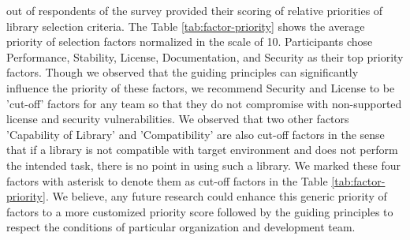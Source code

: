  out of  respondents of the survey provided their scoring of relative priorities of library selection criteria. The Table \ref{tab:factor-priority} shows the average priority of selection factors normalized in the scale of 10. Participants chose Performance, Stability, License, Documentation, and Security as their top priority factors. Though we observed that the guiding principles can significantly influence the priority of these factors, we recommend Security and License to be 'cut-off' factors for any team so that they do not compromise with non-supported license and security vulnerabilities. We observed that two other factors 'Capability of Library' and 'Compatibility' are also cut-off factors in the sense that if a library is not compatible with target environment and does not perform the intended task, there is no point in using such a library. We marked these four factors with asterisk to denote them as cut-off factors in the Table \ref{tab:factor-priority}. We believe, any future research could enhance this generic priority of factors to a more customized priority score followed by the guiding principles to respect the conditions of particular organization and development team.
